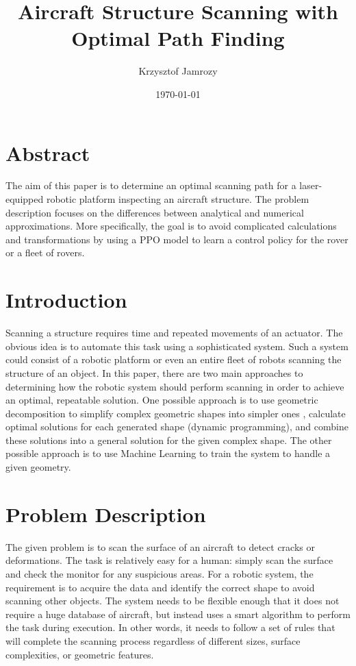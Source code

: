 \documentclass[11pt,a4paper,oneside,onecolumn]{article}
\title{Aircraft Structure Scanning with Optimal Path Finding}
\author{Krzysztof Jamrozy}
\date{\today}
\begin{document}
\maketitle

\section*{Abstract}
The aim of this paper is to determine an optimal scanning path for a laser-equipped robotic platform inspecting an aircraft structure. The problem description focuses on the differences between analytical and numerical approximations. More specifically, the goal is to avoid complicated calculations and transformations by using a PPO model to learn a control policy for the rover or a fleet of rovers.

\section{Introduction}
Scanning a structure requires time and repeated movements of an actuator. The obvious idea is to automate this task using a sophisticated system. Such a system could consist of a robotic platform or even an entire fleet of robots scanning the structure of an object. In this paper, there are two main approaches to determining how the robotic system should perform scanning in order to achieve an optimal, repeatable solution. One possible approach is to use geometric decomposition to simplify complex geometric shapes into simpler ones \cite{chandrajit1994geometry}, calculate optimal solutions for each generated shape (dynamic programming), and combine these solutions into a general solution for the given complex shape. The other possible approach is to use Machine Learning to train the system to handle a given geometry.


\section{Problem Description}
The given problem is to scan the surface of an aircraft to detect cracks or deformations. The task is relatively easy for a human: simply scan the surface and check the monitor for any suspicious areas. For a robotic system, the requirement is to acquire the data and identify the correct shape to avoid scanning other objects. The system needs to be flexible enough that it does not require a huge database of aircraft, but instead uses a smart algorithm to perform the task during execution. In other words, it needs to follow a set of rules that will complete the scanning process regardless of different sizes, surface complexities, or geometric features. 
\end{document}
